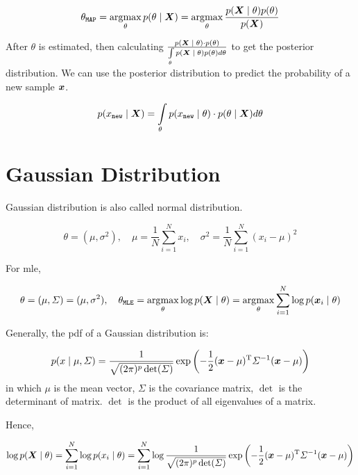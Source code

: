 \begin{equation}
	\theta_{\mathtt{MAP}} = \argmax_{\theta} p\giventhat{\theta}{\vX} = \argmax_{\theta} \frac{p\giventhat{\vX}{\theta} p(\theta)}{p(\vX)}
\end{equation}


After \(\theta\) is estimated, then  calculating \(\frac{p\giventhat{\vX}{\theta} \cdot p(\theta)}{\int\limits_{\theta} p\giventhat{\vX}{\theta} p(\theta) d\theta}\) to get the posterior distribution.
We can use the posterior distribution to predict the probability of a new sample \(\vx\).

\begin{equation}
	p \giventhat{x_{\mathtt{new}}}{\vX}  = \int\limits_{\theta} p\giventhat{x_{\mathtt{new}}}{\theta} \cdot p\giventhat{\theta}{\vX} d\theta
\end{equation}

\section{Gaussian Distribution}

Gaussian distribution is also called normal distribution.

\begin{equation}
	\theta = (\mu, \sigma^2), \quad \mu = \frac{1}{N} \sum_{i=1}^{N} x_i, \quad \sigma^2 = \frac{1}{N} \sum_{i=1}^{N} (x_i - \mu)^2
\end{equation}

For \gls{mle},

\begin{equation}
	\theta = (\mu, \Sigma) = (\mu, \sigma^2), \quad \theta_{\mathtt{MLE}} = \argmax_{\theta} \log p\giventhat{\vX}{\theta} = \argmax_{\theta} \sum_{i=1}^{N} \log p\giventhat{\vx_i}{\theta}
\end{equation}


Generally, the \gls{pdf} of a Gaussian distribution is:

\begin{equation}
	p\giventhat{x}{\mu, \Sigma} =  \frac{1}{\sqrt{(2\pi)^p \det(\Sigma)}} \exp\left(-\frac{1}{2} (\vx - \mu)\transp \Sigma^{-1} (\vx - \mu)\right)
\end{equation}
in which \(\mu\) is the mean vector, \(\Sigma\) is the covariance matrix, \(\det\) is the determinant of matrix.
\(\det\)  is the product of all eigenvalues of a matrix.

Hence,

\begin{equation}
	\log p\giventhat{\vX}{\theta}  = \sum_{i=1}^{N} \log p\giventhat{x_i}{\theta} = \sum_{i=1}^{N} \log \frac{1}{\sqrt{(2\pi)^p \det(\Sigma)}} \exp\left(-\frac{1}{2} (\vx - \mu)\transp \Sigma^{-1} (\vx - \mu)\right)
\end{equation}

